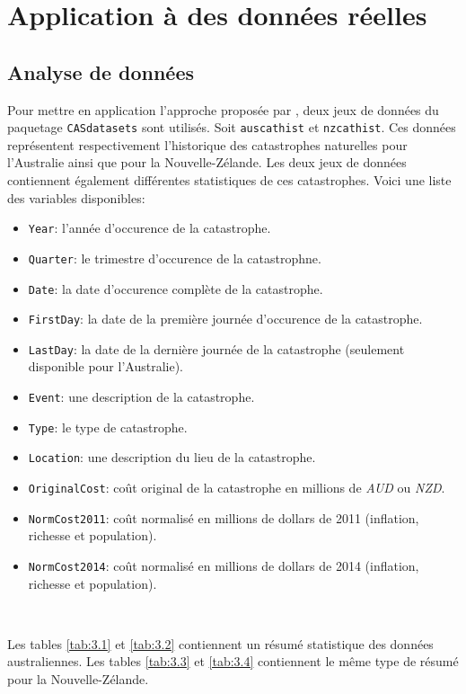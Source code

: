 

\chapter{Application à des données réelles}
\label{chap:application} 

\section{Analyse de données}

Pour mettre en application l'approche proposée par \cite{chavez2016extreme}, deux jeux de données du paquetage \texttt{CASdatasets} sont utilisés. Soit \texttt{auscathist} et \texttt{nzcathist}. Ces données représentent respectivement l'historique des catastrophes naturelles pour l'Australie ainsi que pour la Nouvelle-Zélande. Les deux jeux de données contiennent également différentes statistiques de ces catastrophes. Voici une liste des variables disponibles:
\begin{itemize}
\item \texttt{Year}: l'année d'occurence de la catastrophe.
\item \texttt{Quarter}: le trimestre d'occurence de la catastrophne.
\item \texttt{Date}: la date d'occurence complète de la catastrophe.
\item \texttt{FirstDay}: la date de la première journée d'occurence de la catastrophe.
\item \texttt{LastDay}: la date de la dernière journée de la catastrophe (seulement disponible pour l'Australie).
\item \texttt{Event}: une description de la catastrophe.
\item \texttt{Type}: le type de catastrophe.
\item \texttt{Location}: une description du lieu de la catastrophe.
\item \texttt{OriginalCost}: coût original de la catastrophe en millions de \textit{AUD} ou \textit{NZD}.
\item \texttt{NormCost2011}: coût normalisé en millions de dollars de 2011 (inflation, richesse et population).
\item \texttt{NormCost2014}: coût normalisé en millions de dollars de 2014 (inflation, richesse et population).
\end{itemize}
\

Les tables \ref{tab:3.1} et \ref{tab:3.2} contiennent un résumé statistique des données australiennes. Les tables \ref{tab:3.3} et \ref{tab:3.4} contiennent le même type de résumé pour la Nouvelle-Zélande.



